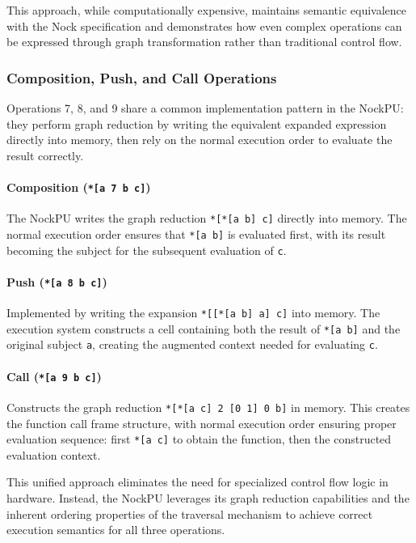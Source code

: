 \documentclass[twoside]{article}
\begin{document}
This approach, while computationally expensive, maintains semantic equivalence with the Nock specification and demonstrates how even complex operations can be expressed through graph transformation rather than traditional control flow.

\subsubsection{Composition, Push, and Call Operations}

Operations 7, 8, and 9 share a common implementation pattern in the NockPU: they perform graph reduction by writing the equivalent expanded expression directly into memory, then rely on the normal execution order to evaluate the result correctly.

\paragraph{Composition (\texttt{*[a 7 b c]})} The NockPU writes the graph reduction \texttt{*[*[a b] c]} directly into memory. The normal execution order ensures that \texttt{*[a b]} is evaluated first, with its result becoming the subject for the subsequent evaluation of \texttt{c}.

\paragraph{Push (\texttt{*[a 8 b c]})} Implemented by writing the expansion \texttt{*[[*[a b] a] c]} into memory. The execution system constructs a cell containing both the result of \texttt{*[a b]} and the original subject \texttt{a}, creating the augmented context needed for evaluating \texttt{c}.

\paragraph{Call (\texttt{*[a 9 b c]})} Constructs the graph reduction \texttt{*[*[a c] 2 [0 1] 0 b]} in memory. This creates the function call frame structure, with normal execution order ensuring proper evaluation sequence: first \texttt{*[a c]} to obtain the function, then the constructed evaluation context.

This unified approach eliminates the need for specialized control flow logic in hardware. Instead, the NockPU leverages its graph reduction capabilities and the inherent ordering properties of the traversal mechanism to achieve correct execution semantics for all three operations.
\end{document}
